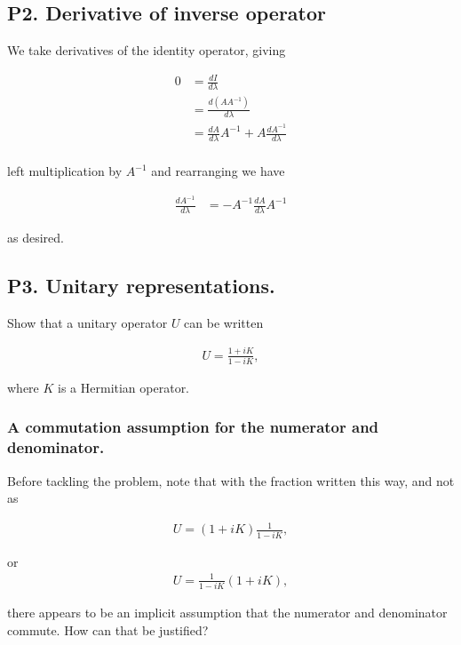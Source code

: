 \subsection{P2. Derivative of inverse operator}

We take derivatives of the identity operator, giving

\begin{align*}
0 
&= \frac{dI}{d\lambda} \\
&= \frac{d (A A^{-1})}{d\lambda} \\
&= \frac{d A }{d\lambda} A^{-1} + A \frac{d A^{-1}}{d\lambda} \\
\end{align*}

left multiplication by $A^{-1}$ and rearranging we have

\begin{align*}
\frac{d A^{-1}}{d\lambda} 
&= -A^{-1} \frac{d A }{d\lambda} A^{-1} 
\end{align*}

as desired.

\subsection{P3. Unitary representations.}

Show that a unitary operator $U$ can be written

\begin{align*}
U = \frac{1 + iK}{1-iK},
\end{align*}

where $K$ is a Hermitian operator.

\subsubsection{A commutation assumption for the numerator and denominator.}

Before tackling the problem, note that with the fraction written this way, and not as

\begin{align}\label{eqn:desaiDiracNotes:2}
U = (1 + iK)\frac{1}{1-iK},
\end{align}

or
\begin{align*}
U = \frac{1}{1-iK}(1 + iK),
\end{align*}

there appears to be an implicit assumption that the numerator and denominator commute.  How can that be justified?

